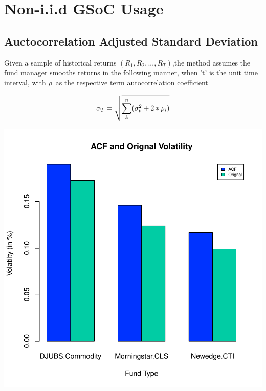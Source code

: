 \documentclass[12pt,letterpaper,english]{article}
\begin{document}
\section{Non-i.i.d GSoC Usage}
\subsection{Auctocorrelation Adjusted Standard Deviation}
Given a sample of historical returns \((R_1,R_2, . . .,R_T)\),the method assumes the fund manager smooths returns in the following manner, when 't' is the unit time interval, with  $\rho$\ as the respective term autocorrelation coefficient

  
\begin{equation}
 \sigma_{T}  =   \sqrt{  \sum_k^n(\sigma_{t}^2 +  2*\rho_i) } \\
\end{equation}


\includegraphics{Commodity-005}
\end{document}
